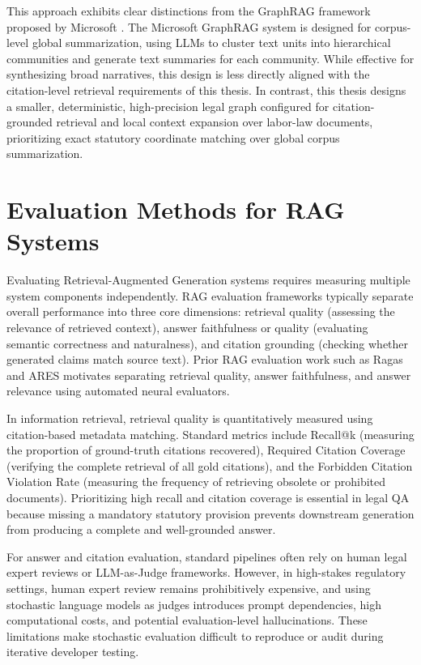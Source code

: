 This approach exhibits clear distinctions from the GraphRAG framework proposed by Microsoft \cite{edge2024graphrag}. The Microsoft GraphRAG system is designed for corpus-level global summarization, using LLMs to cluster text units into hierarchical communities and generate text summaries for each community. While effective for synthesizing broad narratives, this design is less directly aligned with the citation-level retrieval requirements of this thesis. In contrast, this thesis designs a smaller, deterministic, high-precision legal graph configured for citation-grounded retrieval and local context expansion over labor-law documents, prioritizing exact statutory coordinate matching over global corpus summarization.

\section{Evaluation Methods for RAG Systems}
Evaluating Retrieval-Augmented Generation systems requires measuring multiple system components independently. RAG evaluation frameworks typically separate overall performance into three core dimensions: retrieval quality (assessing the relevance of retrieved context), answer faithfulness or quality (evaluating semantic correctness and naturalness), and citation grounding (checking whether generated claims match source text). Prior RAG evaluation work such as Ragas \cite{es2023ragas} and ARES \cite{saadfalcon2023ares} motivates separating retrieval quality, answer faithfulness, and answer relevance using automated neural evaluators.

In information retrieval, retrieval quality is quantitatively measured using citation-based metadata matching. Standard metrics include Recall@k (measuring the proportion of ground-truth citations recovered), Required Citation Coverage (verifying the complete retrieval of all gold citations), and the Forbidden Citation Violation Rate (measuring the frequency of retrieving obsolete or prohibited documents). Prioritizing high recall and citation coverage is essential in legal QA because missing a mandatory statutory provision prevents downstream generation from producing a complete and well-grounded answer.

For answer and citation evaluation, standard pipelines often rely on human legal expert reviews or LLM-as-Judge frameworks. However, in high-stakes regulatory settings, human expert review remains prohibitively expensive, and using stochastic language models as judges introduces prompt dependencies, high computational costs, and potential evaluation-level hallucinations. These limitations make stochastic evaluation difficult to reproduce or audit during iterative developer testing.


